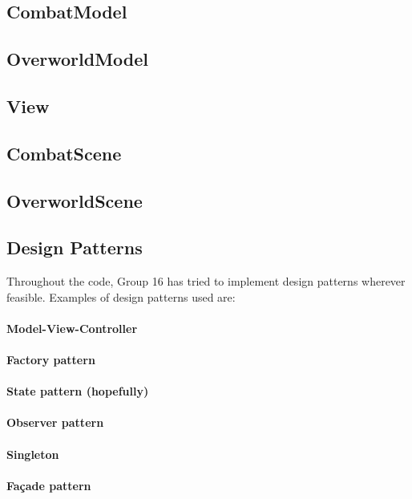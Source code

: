 \subsection{CombatModel}
\label{combatmodel}

\subsection{OverworldModel}
\label{overworldmodel}

\subsection{View}
\label{view}

\subsection{CombatScene}
\label{combatscene}

\subsection{OverworldScene}
\label{overworldscene}


\subsection{Design Patterns}
Throughout the code, Group 16 has tried to implement design patterns wherever feasible. Examples of design patterns used are:
\paragraph{Model-View-Controller\\}
\paragraph{Factory pattern\\}
\paragraph{State pattern (hopefully)\\}
\paragraph{Observer pattern\\}
\paragraph{Singleton\\}
\paragraph{Façade pattern\\}

